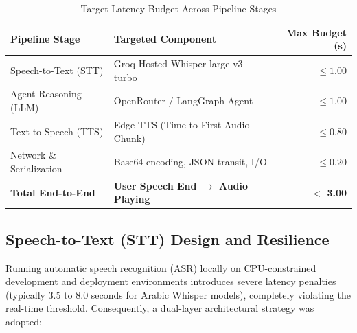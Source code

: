 \begin{table}[htbp]
\centering
\caption{Target Latency Budget Across Pipeline Stages}
\label{tab:latency_budget}
\begin{tabular}{llr}
\toprule
\textbf{Pipeline Stage} & \textbf{Targeted Component} & \textbf{Max Budget (s)} \\
\midrule
Speech-to-Text (STT) & Groq Hosted Whisper-large-v3-turbo & $\le 1.00$ \\
Agent Reasoning (LLM) & OpenRouter / LangGraph Agent & $\le 1.00$ \\
Text-to-Speech (TTS) & Edge-TTS (Time to First Audio Chunk) & $\le 0.80$ \\
Network \& Serialization & Base64 encoding, JSON transit, I/O & $\le 0.20$ \\
\midrule
\textbf{Total End-to-End} & \textbf{User Speech End $\rightarrow$ Audio Playing} & \textbf{$<$ 3.00} \\
\bottomrule
\end{tabular}
\end{table}

\subsection{Speech-to-Text (STT) Design and Resilience}
\label{subsec:stt_design}

Running automatic speech recognition (ASR) locally on CPU-constrained development and deployment environments introduces severe latency penalties (typically 3.5 to 8.0 seconds for Arabic Whisper models), completely violating the real-time threshold. Consequently, a dual-layer architectural strategy was adopted:

